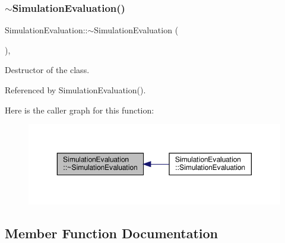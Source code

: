 \subsubsection{\texorpdfstring{$\sim$\+Simulation\+Evaluation()}{~SimulationEvaluation()}}
{\footnotesize\ttfamily Simulation\+Evaluation\+::$\sim$\+Simulation\+Evaluation (\begin{DoxyParamCaption}{ }\end{DoxyParamCaption})\hspace{0.3cm}{\ttfamily [override]}, {\ttfamily [default]}}



Destructor of the class. 



Referenced by Simulation\+Evaluation().

Here is the caller graph for this function\+:
\nopagebreak
\begin{figure}[H]
\begin{center}
\leavevmode
\includegraphics[width=350pt]{d1/df7/classSimulationEvaluation_aecec6c909c3c017be7ed1e65f23f8452_icgraph}
\end{center}
\end{figure}


\subsection{Member Function Documentation}
\mbox{\label{classSimulationEvaluation_ac8dec0177f09c24785ddb353194efe83}} 
